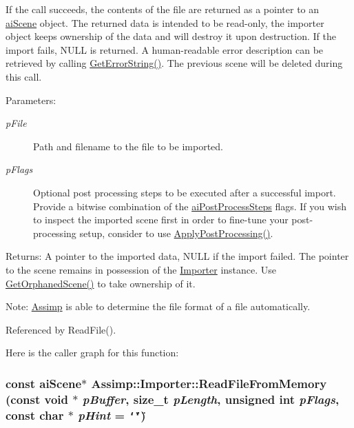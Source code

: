If the call succeeds, the contents of the file are returned as a pointer to an \hyperlink{structai_scene}{aiScene} object. The returned data is intended to be read-only, the importer object keeps ownership of the data and will destroy it upon destruction. If the import fails, NULL is returned. A human-readable error description can be retrieved by calling \hyperlink{class_assimp_1_1_importer_23bab5ba8cb9b6886c690a610766668b}{GetErrorString()}. The previous scene will be deleted during this call. \begin{Desc}
\item[Parameters:]
\begin{description}
\item[{\em pFile}]Path and filename to the file to be imported. \item[{\em pFlags}]Optional post processing steps to be executed after a successful import. Provide a bitwise combination of the \hyperlink{postprocess_8h_64795260b95f5a4b3f3dc1be4f52e410}{aiPostProcessSteps} flags. If you wish to inspect the imported scene first in order to fine-tune your post-processing setup, consider to use \hyperlink{class_assimp_1_1_importer_5872e749c1451fee64183fc14f1fc81d}{ApplyPostProcessing()}. \end{description}
\end{Desc}
\begin{Desc}
\item[Returns:]A pointer to the imported data, NULL if the import failed. The pointer to the scene remains in possession of the \hyperlink{class_assimp_1_1_importer}{Importer} instance. Use \hyperlink{class_assimp_1_1_importer_60eb9042fb85bfbd61a863e131a56ecd}{GetOrphanedScene()} to take ownership of it.\end{Desc}
\begin{Desc}
\item[Note:]\hyperlink{namespace_assimp}{Assimp} is able to determine the file format of a file automatically. \end{Desc}


Referenced by ReadFile().

Here is the caller graph for this function:\hypertarget{class_assimp_1_1_importer_9b3c5e8b1042702f449e84a95b3324f6}{
\subsubsection[ReadFileFromMemory]{\setlength{\rightskip}{0pt plus 5cm}const {\bf aiScene}$\ast$ Assimp::Importer::ReadFileFromMemory (const void $\ast$ {\em pBuffer}, \/  size\_\-t {\em pLength}, \/  unsigned int {\em pFlags}, \/  const char $\ast$ {\em pHint} = {\tt \char`\"{}\char`\"{}})}}
\label{class_assimp_1_1_importer_9b3c5e8b1042702f449e84a95b3324f6}


